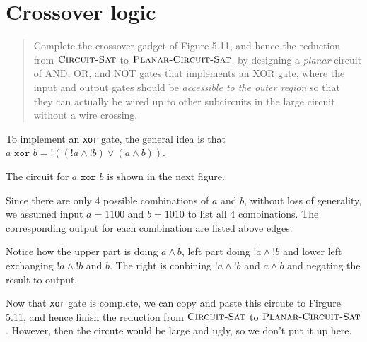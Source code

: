 \section*{Crossover logic}
    \begin{quote}
    Complete the crossover gadget of Figure 5.11, and hence the reduction from
    $\textsc{Circuit-Sat}$ to $\textsc{Planar-Circuit-Sat}$,
    by designing a \emph{planar} circuit of AND, OR, and NOT gates that implements an XOR gate, 
    where
    the input and output gates should be \emph{accessible to the outer region} so that they can actually be wired up to other subcircuits in the large circuit without a wire crossing.
    \end{quote}

    To implement an \texttt{xor} gate, the general idea is that $a \texttt{ xor } b = !((!a \wedge !b) \vee (a \wedge b))$.
    
    The circuit for $a \texttt{ xor } b$ is shown in the next figure. 

    Since there are only 4 possible combinations of $a$ and $b$, without loss of generality, we assumed input $a = 1100$ and $b = 1010$ to list all 4 combinations. 
    The corresponding output for each combination are listed above edges.

    Notice how the upper part is doing $a \wedge b$, left part doing $!a \wedge !b$ and lower left exchanging $!a \wedge !b$ and $b$.
    The right is conbining $!a \wedge !b$ and $a \wedge b$ and negating the result to output.

    Now that \texttt{xor} gate is complete, we can copy and paste this circute to Firgure 5.11, and hence finish the reduction from
    $\textsc{Circuit-Sat}$ to $\textsc{Planar-Circuit-Sat}$.
    However, then the circute would be large and ugly, so we don't put it up here.

